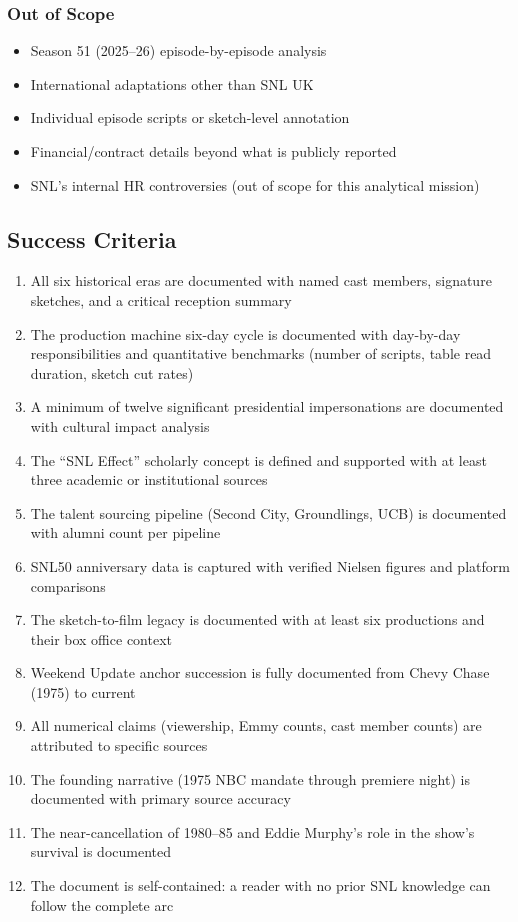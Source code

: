 \documentclass[11pt,letterpaper]{article}
\begin{document}
\subsubsection{Out of Scope}
\begin{itemize}[noitemsep]
  \item Season 51 (2025--26) episode-by-episode analysis
  \item International adaptations other than SNL UK
  \item Individual episode scripts or sketch-level annotation
  \item Financial/contract details beyond what is publicly reported
  \item SNL's internal HR controversies (out of scope for this analytical mission)
\end{itemize}

\subsection{Success Criteria}

\begin{enumerate}
  \item All six historical eras are documented with named cast members, signature sketches, and a critical reception summary
  \item The production machine six-day cycle is documented with day-by-day responsibilities and quantitative benchmarks (number of scripts, table read duration, sketch cut rates)
  \item A minimum of twelve significant presidential impersonations are documented with cultural impact analysis
  \item The ``SNL Effect'' scholarly concept is defined and supported with at least three academic or institutional sources
  \item The talent sourcing pipeline (Second City, Groundlings, UCB) is documented with alumni count per pipeline
  \item SNL50 anniversary data is captured with verified Nielsen figures and platform comparisons
  \item The sketch-to-film legacy is documented with at least six productions and their box office context
  \item Weekend Update anchor succession is fully documented from Chevy Chase (1975) to current
  \item All numerical claims (viewership, Emmy counts, cast member counts) are attributed to specific sources
  \item The founding narrative (1975 NBC mandate through premiere night) is documented with primary source accuracy
  \item The near-cancellation of 1980--85 and Eddie Murphy's role in the show's survival is documented
  \item The document is self-contained: a reader with no prior SNL knowledge can follow the complete arc
\end{enumerate}
\end{document}
